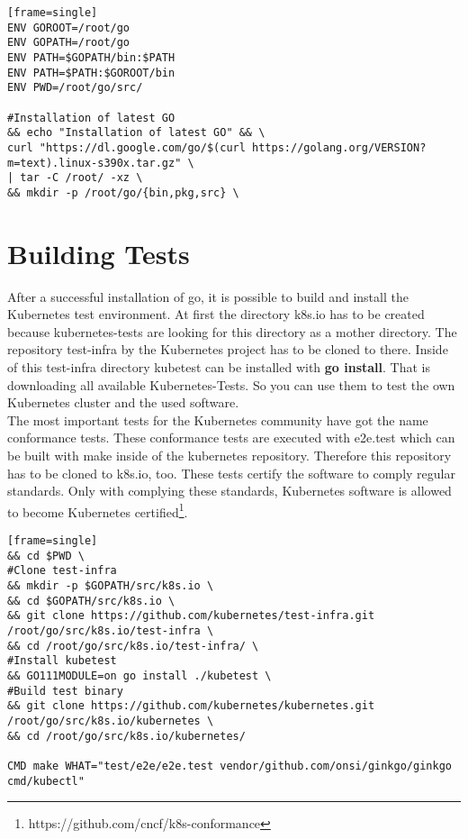 \begin{verbatim}[frame=single]
ENV GOROOT=/root/go
ENV GOPATH=/root/go
ENV PATH=$GOPATH/bin:$PATH
ENV PATH=$PATH:$GOROOT/bin
ENV PWD=/root/go/src/

#Installation of latest GO
&& echo "Installation of latest GO" && \
curl "https://dl.google.com/go/$(curl https://golang.org/VERSION?m=text).linux-s390x.tar.gz" \
| tar -C /root/ -xz \
&& mkdir -p /root/go/{bin,pkg,src} \
\end{verbatim}

\section{Building Tests}
After a successful installation of go, it is possible to build and install the Kubernetes test environment.
At first the directory k8s.io has to be created because kubernetes-tests are looking for this directory as a mother directory. The repository test-infra by the Kubernetes project has to be cloned to there. Inside of this test-infra directory kubetest can be installed with \textbf{go install}. That is downloading all available Kubernetes-Tests. So you can use them to test the own Kubernetes cluster and the used software. \\

The most important tests for the Kubernetes community have got the name conformance tests. These conformance tests are executed with e2e.test  which can be built with make inside of the kubernetes repository. Therefore this repository has to be cloned to k8s.io, too. These tests certify the software to comply regular standards. Only with complying these standards, Kubernetes software is allowed to become Kubernetes certified\footnote{https://github.com/cncf/k8s-conformance}. 



\begin{verbatim}[frame=single]
&& cd $PWD \
#Clone test-infra
&& mkdir -p $GOPATH/src/k8s.io \
&& cd $GOPATH/src/k8s.io \
&& git clone https://github.com/kubernetes/test-infra.git 
/root/go/src/k8s.io/test-infra \
&& cd /root/go/src/k8s.io/test-infra/ \
#Install kubetest
&& GO111MODULE=on go install ./kubetest \
#Build test binary
&& git clone https://github.com/kubernetes/kubernetes.git 
/root/go/src/k8s.io/kubernetes \
&& cd /root/go/src/k8s.io/kubernetes/
 
CMD make WHAT="test/e2e/e2e.test vendor/github.com/onsi/ginkgo/ginkgo cmd/kubectl"
\end{verbatim}

